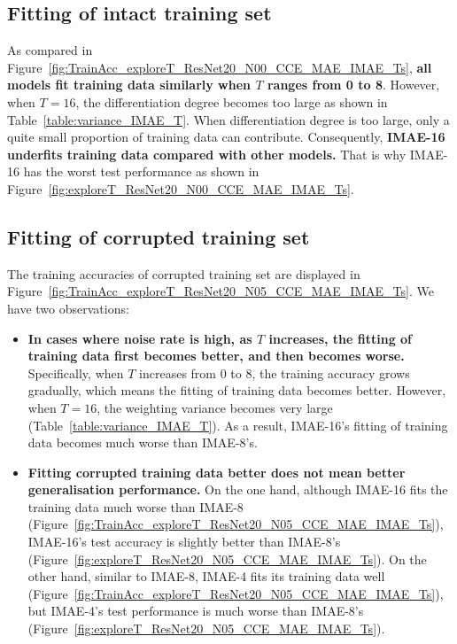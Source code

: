 \documentclass{article}
\begin{document}
\subsection{Fitting of intact training set}

As compared in Figure~\ref{fig:TrainAcc_exploreT_ResNet20_N00_CCE_MAE_IMAE_Ts}, 
\textbf{all models fit training data similarly when $T$ ranges from 0 to 8}. However, when $T=16$, the differentiation degree becomes too large as shown in Table~\ref{table:variance_IMAE_T}. {{When differentiation degree is too large, only a quite small proportion of training data can contribute.}}    
Consequently, \textbf{IMAE-16 underfits training data compared with other models.} That is why IMAE-16 has the worst test performance as shown in  Figure~\ref{fig:exploreT_ResNet20_N00_CCE_MAE_IMAE_Ts}.

\subsection{Fitting of corrupted training set}
\label{sec:fitting_of_corrupted_data}


The training accuracies of corrupted training set are displayed in Figure~\ref{fig:TrainAcc_exploreT_ResNet20_N05_CCE_MAE_IMAE_Ts}.
We have two observations:
\begin{itemize}
	\item \textbf{In cases where noise rate is high, as $T$ increases, the fitting of training data first becomes better, and then becomes worse.}  
	Specifically, when $T$ increases from 0 to 8, the training accuracy grows gradually, which means the fitting of training data becomes better. However, when $T=16$, the weighting variance becomes very large (Table~\ref{table:variance_IMAE_T}). 
As a result, IMAE-16's fitting of training data becomes much worse than IMAE-8's.  
	
	\item \textbf{Fitting corrupted training data better does not mean better generalisation performance.} On the one hand, although IMAE-16 fits the training data much worse than IMAE-8 (Figure~\ref{fig:TrainAcc_exploreT_ResNet20_N05_CCE_MAE_IMAE_Ts}), IMAE-16's test accuracy is slightly better than IMAE-8's (Figure~\ref{fig:exploreT_ResNet20_N05_CCE_MAE_IMAE_Ts}). 
	On the other hand, similar to IMAE-8, IMAE-4 fits its training data well (Figure~\ref{fig:TrainAcc_exploreT_ResNet20_N05_CCE_MAE_IMAE_Ts}), but IMAE-4's test performance is much worse than IMAE-8's (Figure~\ref{fig:exploreT_ResNet20_N05_CCE_MAE_IMAE_Ts}).  
\end{itemize}
\end{document}
